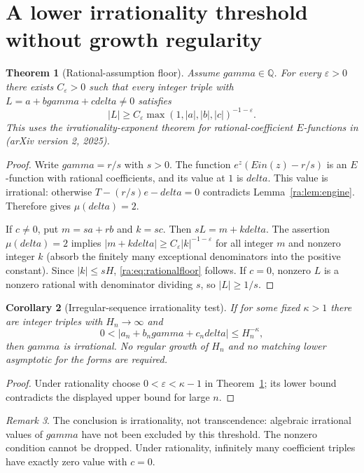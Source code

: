 \documentclass[11pt,a4paper]{article}
\newcommand{\Q}{\mathbb Q}
\DeclareMathOperator{\Ein}{Ein}
\newtheorem{theorem}{Theorem}[section]
\newtheorem{corollary}[theorem]{Corollary}
\theoremstyle{definition}
\theoremstyle{remark}
\newtheorem{remark}[theorem]{Remark}
\theoremstyle{plain}
\numberwithin{equation}{section}
\def\Ein{Ein}\def\gamma{gamma}\def\delta{delta}\def\eta{eta}%
\begin{document}
\section{A lower irrationality threshold without growth regularity}
\begin{theorem}[Rational-assumption floor]\label{ra:thm:rational}
Assume $\gamma\in\Q$. For every $\varepsilon>0$ there exists $C_\varepsilon>0$ such that every integer triple with $L=a+b\gamma+c\delta\ne0$ satisfies
\begin{equation}\label{ra:eq:rationalfloor}
 |L|\ge C_\varepsilon\max(1,|a|,|b|,|c|)^{-1-\varepsilon}.
\end{equation}
This uses the irrationality-exponent theorem for rational-coefficient $E$-functions in \cite[Theorem 1]{FRrational} (arXiv version 2, 2025).
\end{theorem}
\begin{proof}
Write $\gamma=r/s$ with $s>0$. The function $e^z(\Ein(z)-r/s)$ is an $E$-function with rational coefficients, and its value at $1$ is $\delta$. This value is irrational: otherwise $T-(r/s)e-\delta=0$ contradicts Lemma~\ref{ra:lem:engine}. Therefore \cite{FRrational} gives $\mu(\delta)=2$.

If $c\ne0$, put $m=sa+rb$ and $k=sc$. Then $sL=m+k\delta$. The assertion $\mu(\delta)=2$ implies $|m+k\delta|\ge C_\varepsilon|k|^{-1-\varepsilon}$ for all integer $m$ and nonzero integer $k$ (absorb the finitely many exceptional denominators into the positive constant). Since $|k|\le sH$, \eqref{ra:eq:rationalfloor} follows. If $c=0$, nonzero $L$ is a nonzero rational with denominator dividing $s$, so $|L|\ge1/s$.
\end{proof}

\begin{corollary}[Irregular-sequence irrationality test]\label{ra:cor:irrational}
If for some fixed $\kappa>1$ there are integer triples with $H_n\to\infty$ and
\[
 0<|a_n+b_n\gamma+c_n\delta|\le H_n^{-\kappa},
\]
then $\gamma$ is irrational. No regular growth of $H_n$ and no matching lower asymptotic for the forms are required.
\end{corollary}
\begin{proof}
Under rationality choose $0<\varepsilon<\kappa-1$ in Theorem~\ref{ra:thm:rational}; its lower bound contradicts the displayed upper bound for large $n$.
\end{proof}
\begin{remark}
The conclusion is irrationality, not transcendence: algebraic irrational values of $\gamma$ have not been excluded by this threshold. The nonzero condition cannot be dropped. Under rationality, infinitely many coefficient triples have exactly zero value with $c=0$.
\end{remark}
\end{document}
